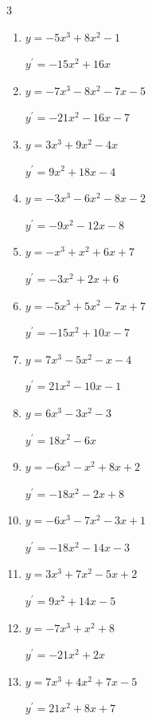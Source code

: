 \begin{multicols}{3}
\begin{enumerate}
  \item $y=-5x^{3}+8x^{2}-1$

        $\displaystyle y^{\prime}=-15x^{2}+16x$

  \item $y=-7x^{3}-8x^{2}-7x-5$

        $\displaystyle y^{\prime}=-21x^{2}-16x-7$

  \item $y=3x^{3}+9x^{2}-4x$

        $\displaystyle y^{\prime}=9x^{2}+18x-4$

  \item $y=-3x^{3}-6x^{2}-8x-2$

        $\displaystyle y^{\prime}=-9x^{2}-12x-8$

\columnbreak %

  \item $y=-x^{3}+x^{2}+6x+7$

        $\displaystyle y^{\prime}=-3x^{2}+2x+6$

  \item $y=-5x^{3}+5x^{2}-7x+7$

        $\displaystyle y^{\prime}=-15x^{2}+10x-7$

  \item $y=7x^{3}-5x^{2}-x-4$

        $\displaystyle y^{\prime}=21x^{2}-10x-1$

  \item $y=6x^{3}-3x^{2}-3$

        $\displaystyle y^{\prime}=18x^{2}-6x$

  \item $y=-6x^{3}-x^{2}+8x+2$

        $\displaystyle y^{\prime}=-18x^{2}-2x+8$

  \item $y=-6x^{3}-7x^{2}-3x+1$

        $\displaystyle y^{\prime}=-18x^{2}-14x-3$

  \item $y=3x^{3}+7x^{2}-5x+2$

        $\displaystyle y^{\prime}=9x^{2}+14x-5$

  \item $y=-7x^{3}+x^{2}+8$

        $\displaystyle y^{\prime}=-21x^{2}+2x$

  \item $y=7x^{3}+4x^{2}+7x-5$

        $\displaystyle y^{\prime}=21x^{2}+8x+7$


\end{enumerate}
\end{multicols}
